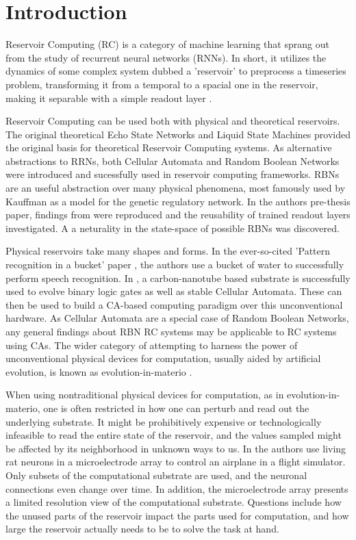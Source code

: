\chapter{Introduction}

Reservoir Computing (RC) is a category of machine learning that sprang out from the study of recurrent neural networks (RNNs).
In short, it utilizes the dynamics of some complex system dubbed a 'reservoir' to preprocess a timeseries problem,
transforming it from a temporal to a spacial one in the reservoir,
making it separable with a simple readout layer \cite{lukovsevivcius2012reservoir}.

Reservoir Computing can be used both with physical and theoretical reservoirs.
The original theoretical Echo State Networks \cite{jaeger2002adaptive} and Liquid State Machines \cite{natschlager2002liquid} provided the original basis for theoretical Reservoir Computing systems.
As alternative abstractions to RRNs,
both Cellular Automata \cite{yilmaz2014reservoir} and Random Boolean Networks \cite{rbn-reservoir} were introduced and sucessfully used in reservoir computing frameworks.
RBNs \cite{gershenson2004introduction} are an useful abstraction over many physical phenomena,
most famously used by Kauffman \cite{kauffman1969metabolic} as a model for the genetic regulatory network.
In the authors pre-thesis paper,
findings from \cite{rbn-reservoir} were reproduced and the reusability of trained readout layers investigated.
A a neturality in the state-space of possible RBNs was discovered.

Physical reservoirs take many shapes and forms.
In the ever-so-cited 'Pattern recognition in a bucket' paper \cite{fernando2003pattern},
the authors use a bucket of water to successfully perform speech recognition.
In \cite{farstad2015evolving},
a carbon-nanotube based substrate is successfully used to evolve binary logic gates as well as stable Cellular Automata.
These can then be used to build a CA-based computing paradigm over this unconventional hardware.
As Cellular Automata are a special case of Random Boolean Networks,
any general findings about RBN RC systems may be applicable to RC systems using CAs.
The wider category of attempting to harness the power of unconventional physical devices for computation,
usually aided by artificial evolution,
is known as evolution-in-materio \cite{miller2002evolution}.

When using nontraditional physical devices for computation, as in evolution-in-materio,
one is often restricted in how one can perturb and read out the underlying substrate.
It might be prohibitively expensive or technologically infeasible to read the entire state of the reservoir,
and the values sampled might be affected by its neighborhood in unknown ways to us.
In \cite{demarse2005adaptive} the authors use living rat neurons in a microelectrode array to control an airplane in a flight simulator.
Only subsets of the computational substrate are used,
and the neuronal connections even change over time.
In addition, the microelectrode array presents a limited resolution view of the computational substrate.
Questions include how the unused parts of the reservoir impact the parts used for computation,
and how large the reservoir actually needs to be to solve the task at hand.

